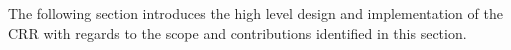 \documentclass[12pt]{ucthesis}
\begin{document}
The following section introduces the high level design and implementation of the CRR with regards to the scope and contributions identified in this section. 




     
      

\end{document}
